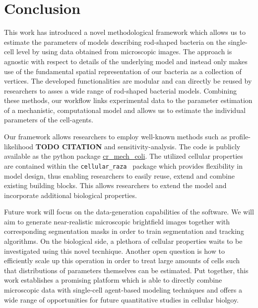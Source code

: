 \documentclass{article}
\begin{document}
\section{Conclusion}

This work has introduced a novel methodological framework which allows us to estimate the parameters
of models describing rod-shaped bacteria on the single-cell level by using data obtained from
microscopic images.
The approach is agnostic with respect to details of the underlying model and instead only makes use
of the fundamental spatial representation of our bacteria as a collection of vertices.
The developed functionalities are modular and can directly be reused by researchers to asses a wide
range of rod-shaped bacterial models.
Combining these methods, our workflow links experimental data to the parameter estimation of a
mechanistic, computational model and allows us to estimate the individual parameters of the
cell-agents.

Our framework allows researchers to employ well-known methods such as profile-likelihood
\textbf{TODO CITATION} and sensitivity-analysis.
The code is publicly available as the python package
\href{https://github.com/jonaspleyer/cr_mech_coli}{cr\_mech\_coli}.
The utilized cellular properties are contained within the \texttt{cellular\_raza}~\cite{Pleyer2025}
package which provides flexibility in model design, thus enabling researchers to easily reuse,
extend and combine existing building blocks.
This allows researchers to extend the model and incorporate additional biological properties.

Future work will focus on the data-generation capabilities of the software.
We will aim to generate near-realistic microscopic brightfield images together with corresponding
segmentation masks in order to train segmentation and tracking algorithms.
On the biological side, a plethora of cellular properties waits to be investigated using this novel
tecnhique.
Another open question is how to efficiently scale up this operation in order to treat large amounts
of cells such that distributions of parameters themselves can be estimated.
Put together, this work establishes a promising platform which is able to directly combine
microscopic data with single-cell agent-based modeling techniques and offers a wide range of
opportunities for future quantitative studies in cellular biolgoy.
\end{document}
